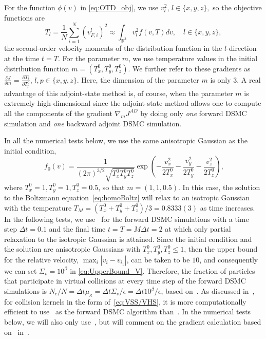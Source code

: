 \documentclass[12pt,nopreprintline]{elsarticle}
\newcommand{\bbR}{\mathbb R} \newcommand{\bbS}{\mathbb S}
\begin{document}
For the function $\phi(v)$ in \eqref{eq:OTD_obj}, we use $v_l^2$, $l\in\{x,y,z\},$ so the objective functions are 
$$T_l=\frac{1}{N}\sum_{i=1}^N{(v_{F,i}^l)^2 } \approx \int_{\bbR^3} v_l^2 f(v,T) dv,\quad l\in\{x,y,z\},$$ the second-order velocity moments of the distribution function in the $l$-direction at the time $t=T$. For the parameter $m$, we use temperature values in the initial distribution function $m=(T_x^0, T_y^0, T_z^0)$. We further refer to these gradients as $\frac{\delta J}{\delta m}=\frac{\partial T_l}{\partial T_p^0}$, $l,p\in\{x,y,z\}$. 
Here, the dimension of the parameter $m$ is only $3$. A real advantage of this adjoint-state method is, of course, when the parameter $m$ is extremely high-dimensional since the adjoint-state method allows one to compute all the components of the gradient $\nabla_m J^{AD}$ by doing only \textit{one} forward DSMC simulation and \textit{one} backward adjoint DSMC simulation.

In all the numerical tests below, we use the same anisotropic Gaussian as the initial condition,
\begin{equation}~\label{eq:IC}
f_0(v) = \frac{1}{(2\pi)^{3/2}\sqrt{T_x^0 T_y^0 T_z^0}} \exp\left(-\frac{v_x^2}{2T_x^0}-\frac{v_y^2}{2T_y^0}-\frac{v_z^2}{2T_z^0}\right),
\end{equation}
where $T_x^0=1,T_y^0=1,T_z^0=0.5$, so that $m=(1,1,0.5)$. In this case, the solution to the Boltzmann equation~\eqref{eq:homoBoltz} will relax to an isotropic Gaussian with the temperature $T_M=(T_x^0+T_y^0+T_z^0)/3=0.8333(3)$ as time increases. In the following tests, we use~ for the forward DSMC simulations with a time step $\Delta t=0.1$ and the final time $t=T=M \Delta t=2$ at which only partial relaxation to the isotropic Gaussian is attained. Since the initial condition and the solution are anisotropic Gaussians with $T_x^0,T_y^0,T_z^0 \leq 1$, then the upper bound for the relative velocity, $\max_i |v_i - v_{i_1}|$, can be taken to be $10$, and consequently we can set $\Sigma_v =10^\beta$ in \eqref{eq:UpperBound_V}. Therefore, the fraction of particles that participate in virtual collisions at every time step of the forward DSMC simulations is $ N_c/N = \Delta t \mu_\kappa = \Delta t \Sigma_v / \epsilon = \Delta t 10^\beta / \epsilon$,  based on~.  As discussed in~, for collision kernels in the form of~\eqref{eq:VSS/VHS}, it is more computationally efficient to use~ as the forward DSMC algorithm than~.  In the numerical tests below, we will also only use~, but will comment on the gradient calculation based on~ in~.
 
\end{document}
